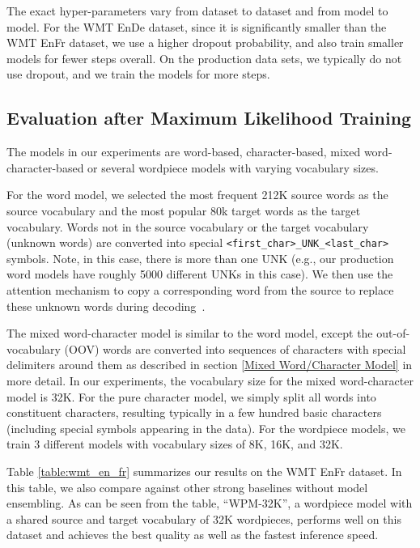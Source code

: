 The exact hyper-parameters vary from dataset to dataset and from model
to model. For the WMT EnDe dataset, since it is significantly
smaller than the WMT EnFr dataset, we use a higher dropout
probability, and also train smaller models for fewer steps overall. 
On the production data sets, we typically do not use dropout, and
we train the models for more steps.

\subsection{Evaluation after Maximum Likelihood Training}

The models in our experiments are word-based, character-based, mixed
word-character-based or several wordpiece models with varying
vocabulary sizes.

For the word model, we selected the most frequent 212K source words as
the source vocabulary and the most popular 80k target words as the
target vocabulary. Words not in the source vocabulary or the target
vocabulary (unknown words) are converted into special 
\texttt{<first\_char>\_UNK\_<last\_char>}
symbols. Note, in this case, there is more than one UNK (e.g., our
production word models have roughly 5000 different UNKs in this case). We then
use the attention mechanism to copy a corresponding word from the
source to replace these unknown words during decoding~\cite{jean2015using}.

The mixed word-character model is similar to the word model, except the
out-of-vocabulary (OOV) words are converted into sequences of
characters with special delimiters around them as described in section
\ref{Mixed Word/Character Model} in more detail. In
our experiments, the vocabulary size for the mixed word-character
model is 32K. For the pure character model, we simply split all words
into constituent characters, resulting typically in a few hundred basic
characters (including special symbols appearing in the data). For the
wordpiece models, we train 3 different models with vocabulary sizes of
8K, 16K, and 32K.







Table \ref{table:wmt_en_fr} summarizes our results on the WMT
EnFr dataset. In this table, we also compare against other
strong baselines without model ensembling.  As can be seen from the
table, ``WPM-32K'', a wordpiece model with a shared source and target
vocabulary of 32K wordpieces, performs well on this dataset and achieves the
best quality as well as the fastest inference speed.

